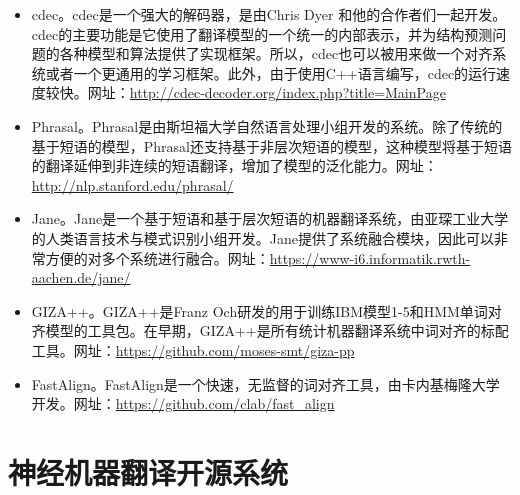 \begin{appendices}
\begin{itemize}
\vspace{0.5em}
\item cdec。cdec是一个强大的解码器，是由Chris Dyer 和他的合作者们一起开发。cdec的主要功能是它使用了翻译模型的一个统一的内部表示，并为结构预测问题的各种模型和算法提供了实现框架。所以，cdec也可以被用来做一个对齐系统或者一个更通用的学习框架。此外，由于使用C++语言编写，cdec的运行速度较快。网址：\url{http://cdec-decoder.org/index.php?title=MainPage}
\vspace{0.5em}
\item Phrasal。Phrasal是由斯坦福大学自然语言处理小组开发的系统。除了传统的基于短语的模型，Phrasal还支持基于非层次短语的模型，这种模型将基于短语的翻译延伸到非连续的短语翻译，增加了模型的泛化能力。网址：\url{http://nlp.stanford.edu/phrasal/}
\vspace{0.5em}
\item Jane。Jane是一个基于短语和基于层次短语的机器翻译系统，由亚琛工业大学的人类语言技术与模式识别小组开发。Jane提供了系统融合模块，因此可以非常方便的对多个系统进行融合。网址：\url{https://www-i6.informatik.rwth-aachen.de/jane/}
\vspace{0.5em}
\item GIZA++。GIZA++是Franz Och研发的用于训练IBM模型1-5和HMM单词对齐模型的工具包。在早期，GIZA++是所有统计机器翻译系统中词对齐的标配工具。网址：\url{https://github.com/moses-smt/giza-pp}
\vspace{0.5em}
\item FastAlign。FastAlign是一个快速，无监督的词对齐工具，由卡内基梅隆大学开发。网址：\url{https://github.com/clab/fast\_align}
\vspace{0.5em}
\end{itemize}

\section{神经机器翻译开源系统}


\end{appendices}

